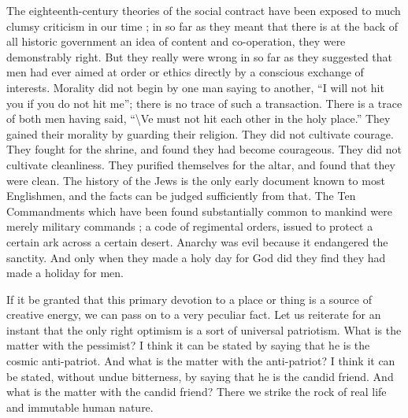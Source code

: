 \documentclass{book}
\begin{document}
The eighteenth-century theories of the social contract have been exposed to much clumsy criticism in our time ; in so far as they meant that there is at the back of all historic government an idea of content and co-operation, they were demonstrably right. But they really were wrong in so far as they suggested that men had ever aimed at order or ethics directly by a conscious exchange of interests. Morality did not begin by one man saying to another, “I will not hit you if you do not hit me”; there is no trace of such a transaction. There is a trace of both men having said, “\textbackslash{}Ve must not hit each other in the holy place.” They gained their morality by guarding their religion. They did not cultivate courage. They fought for the shrine, and found they had become courageous. They did not cultivate cleanliness. They purified themselves for the altar, and found that they were clean. The history of the Jews is the only early document known to most Englishmen, and the facts can be judged sufficiently from that. The Ten Commandments which have been found substantially common to mankind were merely military commands ; a code of regimental orders, issued to protect a certain ark across a certain desert. Anarchy was evil because it endangered the sanctity. And only when they made a holy day for God did they find they had made a holiday for men.

If it be granted that this primary devotion to a place or thing is a source of creative energy, we can pass on to a very peculiar fact. Let us reiterate for an instant that the only right optimism is a sort of universal patriotism. What is the matter with the pessimist? I think it can be stated by saying that he is the cosmic anti-patriot. And what is the matter with the anti-patriot? I think it can be stated, without undue bitterness, by saying that he is the candid friend. And what is the matter with the candid friend? There we strike the rock of real life and immutable human nature.
\end{document}
